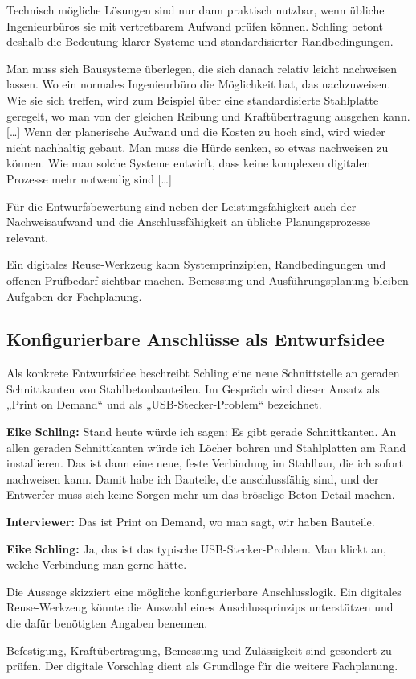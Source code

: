 Technisch mögliche Lösungen sind nur dann praktisch nutzbar, wenn übliche Ingenieurbüros sie mit vertretbarem Aufwand prüfen können. Schling betont deshalb die Bedeutung klarer Systeme und standardisierter Randbedingungen.

\begin{Blockquote}
Man muss sich Bausysteme überlegen, die sich danach relativ leicht nachweisen lassen. Wo ein normales Ingenieurbüro die Möglichkeit hat, das nachzuweisen. Wie sie sich treffen, wird zum Beispiel über eine standardisierte Stahlplatte geregelt, wo man von der gleichen Reibung und Kraftübertragung ausgehen kann. […] Wenn der planerische Aufwand und die Kosten zu hoch sind, wird wieder nicht nachhaltig gebaut. Man muss die Hürde senken, so etwas nachweisen zu können. Wie man solche Systeme entwirft, dass keine komplexen digitalen Prozesse mehr notwendig sind […]
\end{Blockquote}

Für die Entwurfsbewertung sind neben der Leistungsfähigkeit auch der Nachweisaufwand und die Anschlussfähigkeit an übliche Planungsprozesse relevant.

Ein digitales Reuse-Werkzeug kann Systemprinzipien, Randbedingungen und offenen Prüfbedarf sichtbar machen. Bemessung und Ausführungsplanung bleiben Aufgaben der Fachplanung.

\subsection{Konfigurierbare Anschlüsse als Entwurfsidee}

Als konkrete Entwurfsidee beschreibt Schling eine neue Schnittstelle an geraden Schnittkanten von Stahlbetonbauteilen. Im Gespräch wird dieser Ansatz als „Print on Demand“ und als „USB-Stecker-Problem“ bezeichnet.

\begin{Blockquote}
\textbf{Eike Schling:} Stand heute würde ich sagen: Es gibt gerade Schnittkanten. An allen geraden Schnittkanten würde ich Löcher bohren und Stahlplatten am Rand installieren. Das ist dann eine neue, feste Verbindung im Stahlbau, die ich sofort nachweisen kann. Damit habe ich Bauteile, die anschlussfähig sind, und der Entwerfer muss sich keine Sorgen mehr um das bröselige Beton-Detail machen.

\textbf{Interviewer:} Das ist Print on Demand, wo man sagt, wir haben Bauteile.

\textbf{Eike Schling:} Ja, das ist das typische USB-Stecker-Problem. Man klickt an, welche Verbindung man gerne hätte.
\end{Blockquote}

Die Aussage skizziert eine mögliche konfigurierbare Anschlusslogik. Ein digitales Reuse-Werkzeug könnte die Auswahl eines Anschlussprinzips unterstützen und die dafür benötigten Angaben benennen.

Befestigung, Kraftübertragung, Bemessung und Zulässigkeit sind gesondert zu prüfen. Der digitale Vorschlag dient als Grundlage für die weitere Fachplanung.
